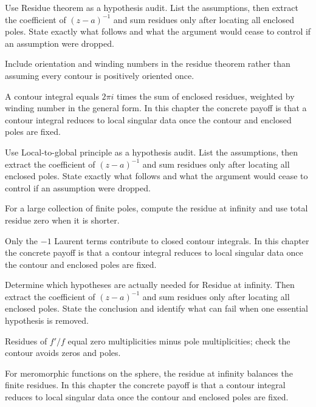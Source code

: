 \begin{exercise}\label{exr:iv10-04}
Use Residue theorem as a hypothesis audit. List the assumptions, then extract the coefficient of \((z-a)^{-1}\) and sum residues only after locating all enclosed poles. State exactly what follows and what the argument would cease to control if an assumption were dropped.
\end{exercise}
\begin{hint}
Include orientation and winding numbers in the residue theorem rather than assuming every contour is positively oriented once.
\end{hint}
\begin{solution}
A contour integral equals $2\pi i$ times the sum of enclosed residues, weighted by winding number in the general form. In this chapter the concrete payoff is that a contour integral reduces to local singular data once the contour and enclosed poles are fixed.
\end{solution}

\begin{exercise}\label{exr:iv10-05}
Use Local-to-global principle as a hypothesis audit. List the assumptions, then extract the coefficient of \((z-a)^{-1}\) and sum residues only after locating all enclosed poles. State exactly what follows and what the argument would cease to control if an assumption were dropped.
\end{exercise}
\begin{hint}
For a large collection of finite poles, compute the residue at infinity and use total residue zero when it is shorter.
\end{hint}
\begin{solution}
Only the $-1$ Laurent terms contribute to closed contour integrals. In this chapter the concrete payoff is that a contour integral reduces to local singular data once the contour and enclosed poles are fixed.
\end{solution}

\begin{exercise}\label{exr:iv10-06}
Determine which hypotheses are actually needed for Residue at infinity. Then extract the coefficient of \((z-a)^{-1}\) and sum residues only after locating all enclosed poles. State the conclusion and identify what can fail when one essential hypothesis is removed.
\end{exercise}
\begin{hint}
Residues of \(f'/f\) equal zero multiplicities minus pole multiplicities; check the contour avoids zeros and poles.
\end{hint}
\begin{solution}
For meromorphic functions on the sphere, the residue at infinity balances the finite residues. In this chapter the concrete payoff is that a contour integral reduces to local singular data once the contour and enclosed poles are fixed.
\end{solution}

